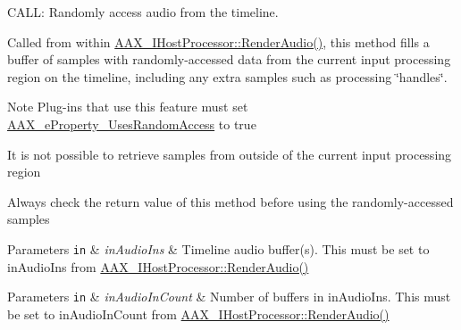 C\+A\+L\+L\+: Randomly access audio from the timeline. 

Called from within \hyperlink{a00066_a8ede94912e89621bf6951042687c3c4a}{A\+A\+X\+\_\+\+I\+Host\+Processor\+::\+Render\+Audio()}, this method fills a buffer of samples with randomly-\/accessed data from the current input processing region on the timeline, including any extra samples such as processing \char`\"{}handles\char`\"{}.

\begin{DoxyNote}{Note}
Plug-\/ins that use this feature must set \hyperlink{a00283_a6571f4e41a5dd06e4067249228e2249eab0bbaabe0a03b37e5a69f04a6f306076}{A\+A\+X\+\_\+e\+Property\+\_\+\+Uses\+Random\+Access} to {\ttfamily true} 

It is not possible to retrieve samples from outside of the current input processing region 

Always check the return value of this method before using the randomly-\/accessed samples
\end{DoxyNote}

\begin{DoxyParams}[1]{Parameters}
\mbox{\tt in}  & {\em in\+Audio\+Ins} & Timeline audio buffer(s). This must be set to {\ttfamily in\+Audio\+Ins} from \hyperlink{a00066_a8ede94912e89621bf6951042687c3c4a}{A\+A\+X\+\_\+\+I\+Host\+Processor\+::\+Render\+Audio()} \\
\hline
\end{DoxyParams}



\begin{DoxyParams}[1]{Parameters}
\mbox{\tt in}  & {\em in\+Audio\+In\+Count} & Number of buffers in {\ttfamily in\+Audio\+Ins}. This must be set to {\ttfamily in\+Audio\+In\+Count} from \hyperlink{a00066_a8ede94912e89621bf6951042687c3c4a}{A\+A\+X\+\_\+\+I\+Host\+Processor\+::\+Render\+Audio()} \\
\hline
\end{DoxyParams}



